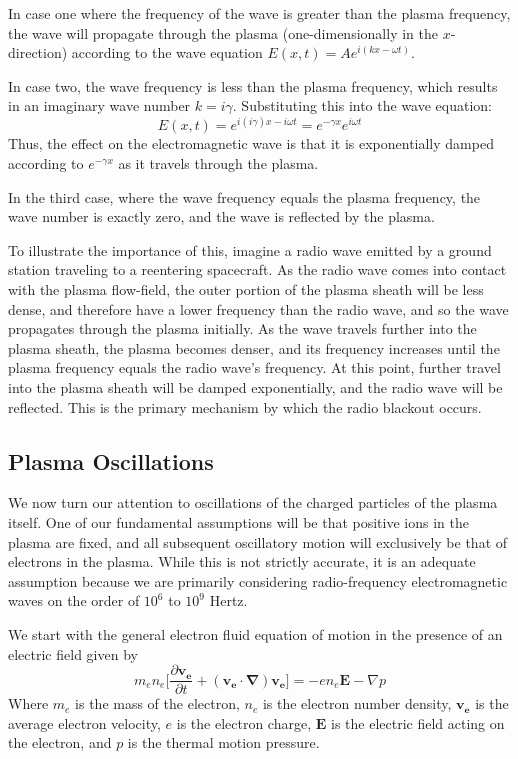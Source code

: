 \documentclass[twocolumn]{article}
\begin{document}
In case one where the frequency of the wave is greater than the plasma frequency, the wave will propagate through the plasma (one-dimensionally in the $x$-direction) according to the wave equation $E(x,t) = Ae^{i(kx - \omega t)}$.

In case two, the wave frequency is less than the plasma frequency, which results in an imaginary wave number $k = i\gamma$.
Substituting this into the wave equation:
\begin{equation}
	E(x,t) = e^{i(i\gamma)x - i\omega t} = e^{-\gamma x}e^{i\omega t}
\end{equation}
Thus, the effect on the electromagnetic wave is that it is exponentially damped according to $e^{-\gamma x}$ as it travels through the plasma.

In the third case, where the wave frequency equals the plasma frequency, the wave number is exactly zero, and the wave is reflected by the plasma.

To illustrate the importance of this, imagine a radio wave emitted by a ground station traveling to a reentering spacecraft.
As the radio wave comes into contact with the plasma flow-field, the outer portion of the plasma sheath will be less dense, and therefore have a lower frequency than the radio wave, and so the wave propagates through the plasma initially.
As the wave travels further into the plasma sheath, the plasma becomes denser, and its frequency increases until the plasma frequency equals the radio wave's frequency.
At this point, further travel into the plasma sheath will be damped exponentially, and the radio wave will be reflected.
This is the primary mechanism by which the radio blackout occurs.

\subsection*{Plasma Oscillations}
We now turn our attention to oscillations of the charged particles of the plasma itself.
One of our fundamental assumptions will be that positive ions in the plasma are fixed, and all subsequent oscillatory motion will exclusively be that of electrons in the plasma.
While this is not strictly accurate, it is an adequate assumption because we are primarily considering radio-frequency electromagnetic waves on the order of $10^6$ to $10^9$ Hertz.

We start with the general electron fluid equation of motion in the presence of an electric field given by
\begin{equation} \label{eq:emotionhot}
m_en_e \lbrack \frac{\partial \mathbf{v_e}}{\partial t} + \left( \mathbf{v_e} \cdot \mathbf{\nabla} \right) \mathbf{v_e} \rbrack = -en_e\mathbf{E} - \nabla p
\end{equation}
Where $m_e$ is the mass of the electron, $n_e$ is the electron number density, $\mathbf{v_e}$ is the average electron velocity, $e$ is the electron charge, $\mathbf{E}$ is the electric field acting on the electron, and $p$ is the thermal motion pressure.
\end{document}
